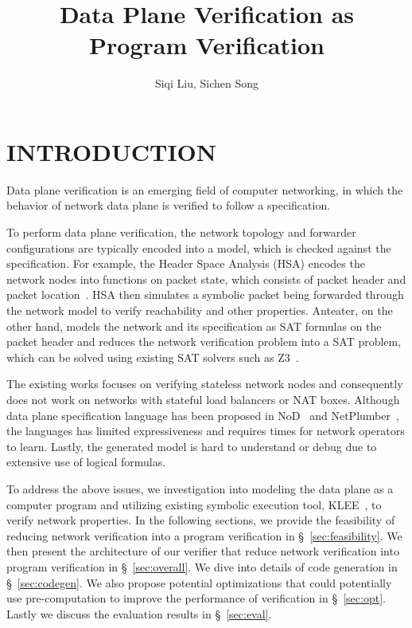 \documentclass[letterpaper, 10 pt, conference]{ieeeconf}  %
\title{\LARGE \bf
Data Plane Verification as Program Verification
}
\author{Siqi Liu,
Sichen Song
}
\begin{document}
\maketitle
\thispagestyle{empty}
\pagestyle{empty}



\section{INTRODUCTION}
Data plane verification is an emerging field of computer networking, in which the behavior of network data plane is verified to follow a specification. 

To perform data plane verification, the network topology and forwarder configurations are typically encoded into a model, which is checked against the specification. For example, the Header Space Analysis (HSA) encodes the network nodes into functions on packet state, which consists of packet header and packet location~\cite{hsa}. HSA then simulates a symbolic packet being forwarded through the network model to verify reachability and other properties. Anteater, on the other hand, models the network and its specification as SAT formulas on the packet header and reduces the network verification problem into a SAT problem, which can be solved using existing SAT solvers such as Z3~\cite{z3}.

The existing works focuses on verifying stateless network nodes and consequently does not work on networks with stateful load balancers or NAT boxes. Although data plane specification language has been proposed in NoD~\cite{nod} and NetPlumber~\cite{netp}, the languages has limited expressiveness and requires times for network operators to learn. Lastly, the generated model is hard to understand or debug due to extensive use of logical formulas.

To address the above issues, we investigation into modeling the data plane as a computer program and utilizing existing symbolic execution tool, KLEE~\cite{klee}, to verify network properties. In the following sections, we provide the feasibility of reducing network verification into a program verification in \S~\ref{sec:feasibility}. We then present the architecture of our verifier that reduce network verification into program verification in \S ~\ref{sec:overall}. We dive into details of code generation in \S~\ref{sec:codegen}. We also propose potential optimizations that could potentially use pre-computation to improve the performance of verification in \S~\ref{sec:opt}. Lastly we discuss the evaluation results in \S~\ref{sec:eval}.
\end{document}
